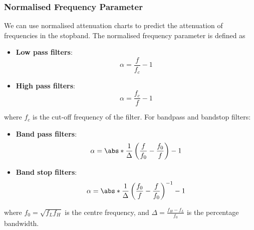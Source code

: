 \documentclass{article}
\begin{document}
\subsubsection{Normalised Frequency Parameter}
We can use normalised attenuation charts to predict the attenuation of
frequencies in the stopband. The normalised frequency parameter is
defined as
\begin{itemize}
    \item \textbf{Low pass filters}:
          \begin{equation*}
              \alpha = \frac{f}{f_c} - 1
          \end{equation*}
    \item \textbf{High pass filters}:
          \begin{equation*}
              \alpha = \frac{f_c}{f} - 1
          \end{equation*}
\end{itemize}
where \(f_c\) is the cut-off frequency of the filter.
For bandpass and bandstop filters:
\begin{itemize}
    \item \textbf{Band pass filters}:
          \begin{equation*}
              \alpha = \abs*{\frac{1}{\Delta} \left( \frac{f}{f_0} - \frac{f_0}{f} \right)} - 1
          \end{equation*}
    \item \textbf{Band stop filters}:
          \begin{equation*}
              \alpha = \abs*{\frac{1}{\Delta} \left( \frac{f_0}{f} - \frac{f}{f_0} \right)^{-1}} - 1
          \end{equation*}
\end{itemize}
where \(f_0 = \sqrt{f_L f_H}\) is the centre frequency, and
\(\Delta = \frac{f_H - f_L}{f_0}\) is the percentage bandwidth.
\end{document}
